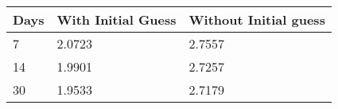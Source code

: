 \begin{tabular}{lll}
Days & With Initial Guess & Without Initial guess \\ 
\hline 
7 & 2.0723 & 2.7557 \\ 
14 & 1.9901 & 2.7257 \\ 
30 & 1.9533 & 2.7179 \\ 
\hline 
\end{tabular}